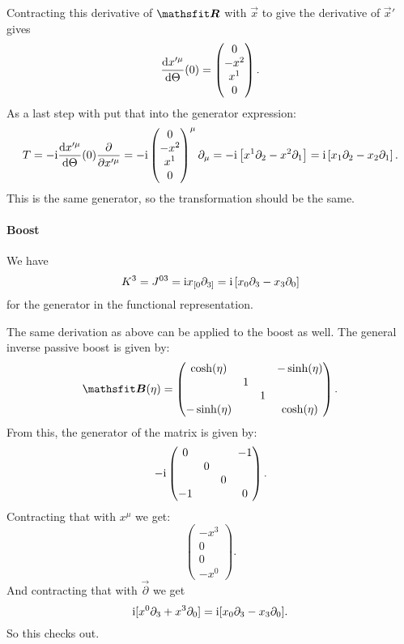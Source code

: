 \documentclass[11pt, english, fleqn, DIV=15, headinclude, BCOR=1cm]{scrartcl}
\begin{document}
Contracting this derivative of $\tens R$ with $\vec x$ to give the derivative
of $\vec x'$ gives
\[
    \frac{\mathop{}\!\mathrm d {x'^\mu}}{\mathop{}\!\mathrm d {\Theta}} (0) =
    \begin{pmatrix}
        0 \\ -x^2 \\ x^1 \\ 0
    \end{pmatrix}.
\]
As a last step with put that into the generator expression:
\[
    T = - \mathrm i \frac{\mathop{}\!\mathrm d {x'^\mu}}{\mathop{}\!\mathrm d {\Theta}}(0) \frac{\partial {}}{\partial {x'^\mu}}
    = - \mathrm i 
    \begin{pmatrix}
        0 \\ -x^2 \\ x^1 \\ 0
    \end{pmatrix}^\mu \partial_\mu
    = - \mathrm i \left[  x^1 \partial_2 - x^2 \partial_1 \right]
    = \mathrm i \left[  x_1 \partial_2 - x_2 \partial_1 \right].
\]
This is the same generator, so the transformation should be the same.

\paragraph{Boost}

We have
\[
    K^3 = J^{03} = \mathrm i x_{[0} \partial_{3]} =  \mathrm i \left[ x_0 \partial_3 - x_3
    \partial_0 \right]
\]
for the generator in the functional representation.

The same derivation as above can be applied to the boost as well. The general
inverse passive boost is given by:
\[
    \tens B(\eta) =
    \begin{pmatrix}
        \cosh(\eta) & & & -\sinh(\eta) \\
                    & 1 & & \\
                    & & 1 & \\
        -\sinh(\eta) & & & \cosh(\eta)
    \end{pmatrix}
    .
\]
From this, the generator of the matrix is given by:
\[
    - \mathrm i
    \begin{pmatrix}
        0 & & & -1 \\
          & 0 & & \\
          & & 0 & \\
        -1 & & & 0
    \end{pmatrix}.
\]
Contracting that with $x^\mu$ we get:
\[
    \begin{pmatrix}
        -x^3 \\ 0 \\ 0 \\ -x^0
    \end{pmatrix}.
\]
And contracting that with $\vec \partial$ we get
\[
    \mathrm i [x^0 \partial_3 + x^3 \partial_0]
    = 
    \mathrm i [x_0 \partial_3 - x_3 \partial_0].
\]
So this checks out.
\end{document}
